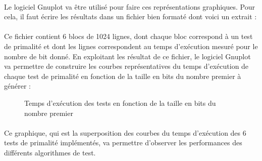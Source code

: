 			\paragraph{} Le logiciel {\ttfamily Gnuplot} va être utilisé pour faire ces représentations graphiques. Pour cela, il faut écrire les résultats dans un fichier bien formaté dont voici un extrait :
			
			
			\paragraph{}Ce fichier contient 6 blocs de 1024 lignes, dont chaque bloc correspond à un test de primalité et dont les lignes correspondent au temps d'exécution mesuré pour le nombre de bit donné. En exploitant les résultat de ce fichier, le logiciel {\ttfamily Gnuplot} va permettre de construire les courbes représentatives du temps d'exécution de chaque test de primalité en fonction de la taille en bits du nombre premier à générer :
			
			\begin{figure}[H]\vspace{-1em}\caption{Temps d'exécution des tests en fonction de la taille en bits du nombre premier}\label{fig:M4}\end{figure}
			
			\paragraph{} Ce graphique, qui est la superposition des courbes du temps d'exécution des 6 tests de primalité implémentés, va permettre d'observer les performances des différents algorithmes de test.
